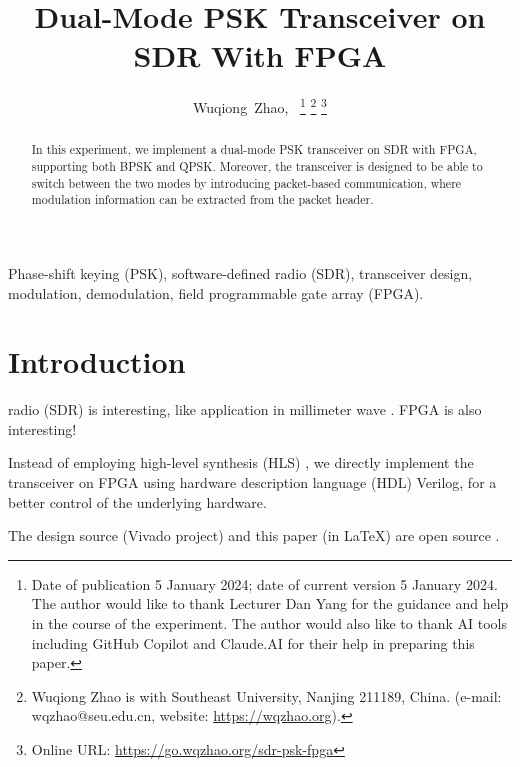 \documentclass[journal,twoside]{IEEEtran}
\newcommand\orcidicon[1]{\href{https://orcid.org/#1}{\mbox{\scalerel*{
  \begin{tikzpicture}[yscale=-1,transform shape]
    \pic{orcidlogo};
  \end{tikzpicture}
}{|}}}}
\begin{document}
  \title{Dual-Mode PSK Transceiver on SDR With FPGA}

  \author{%
    Wuqiong~Zhao{\hspace{.1em}\textsuperscript{\orcidicon{0000-0002-9550-7423}}},~
    \thanks{Date of publication 5 January 2024; date of current version 5 January 2024.
      The author would like to thank Lecturer Dan Yang for the guidance and help in the course of the experiment.
      The author would also like to thank AI tools including GitHub Copilot and Claude.AI for their help in preparing this paper.}
    \thanks{Wuqiong Zhao is with Southeast University, Nanjing 211189, China. (e-mail: wqzhao@seu.edu.cn, website: \url{https://wqzhao.org}).}
    \thanks{Online URL: \url{https://go.wqzhao.org/sdr-psk-fpga}}
  }

  \maketitle

  \begin{abstract}
    In this experiment, we implement a dual-mode PSK transceiver on SDR with FPGA,
    supporting both BPSK and QPSK.
    Moreover, the transceiver is designed to be able to switch between the two modes by introducing packet-based communication,
    where modulation information can be extracted from the packet header.
  \end{abstract}
  \begin{IEEEkeywords}
    Phase-shift keying (PSK), software-defined radio (SDR), transceiver design, modulation, demodulation, field programmable gate array (FPGA).
  \end{IEEEkeywords}

  \section{Introduction}

     radio (SDR) is interesting, like application in millimeter wave \cite{zhao2020m}.
    FPGA is also interesting!

    Instead of employing high-level synthesis (HLS) \cite{zhao2023flexible},
    we directly implement the transceiver on FPGA using hardware description language (HDL) Verilog,
    for a better control of the underlying hardware.

    The design source (Vivado project) and this paper (in \LaTeX) are open source \cite{github_repo}.
    
\end{document}
